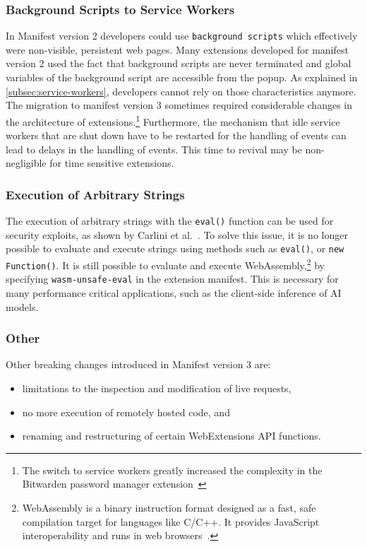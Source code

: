 \subsubsection{Background Scripts to Service Workers}
In Manifest version 2 developers could use \texttt{background scripts} which effectively were non-visible, persistent web pages.
Many extensions developed for manifest version 2 used the fact that background scripts are never terminated and global variables of the background script are accessible from the popup.
As explained in \cref{subsec:service-workers}, developers cannot rely on those characteristics anymore.
The migration to manifest version 3 sometimes required considerable changes in the architecture of extensions.\footnote{
The switch to service workers greatly increased the complexity in the Bitwarden password manager extension~\cite{gonzalez2024bitwarden}}
Furthermore, the mechanism that idle service workers that are shut down have to be restarted for the handling of events can lead to delays in the handling of events.
This time to revival may be non-negligible for time sensitive extensions.

\subsubsection{Execution of Arbitrary Strings}
The execution of arbitrary strings with the \texttt{eval()} function can be used for security exploits, as shown by Carlini et al.~\cite{carlini2012evaluation}.
To solve this issue, it is no longer possible to evaluate and execute strings using methods such as \texttt{eval()}, or \texttt{new Function()}.
It is still possible to evaluate and execute WebAssembly,\footnote{WebAssembly is a binary instruction format designed as a fast, safe compilation target for languages like C/C++. It provides JavaScript interoperability and runs in web browsers~\cite{haas2017wasm}.} by specifying \texttt{wasm-unsafe-eval} in the extension manifest.
This is necessary for many performance critical applications, such as the client-side inference of AI models.

\subsubsection{Other}
Other breaking changes introduced in Manifest version 3 are:
\begin{itemize}
    \item limitations to the inspection and modification of live requests,
    \item no more execution of remotely hosted code, and
    \item renaming and restructuring of certain WebExtensions API functions.
\end{itemize}

